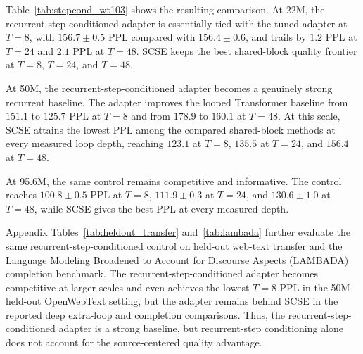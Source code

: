 \documentclass[letterpaper]{article} %
\newcommand{\SCSE}{\textsc{SCSE}}
\theoremstyle{remark}
\begin{document}
Table~\ref{tab:stepcond_wt103} shows the resulting comparison.  At 22M, the recurrent-step-conditioned adapter is essentially tied with the tuned adapter at $T=8$, with $156.7\pm0.5$ PPL compared with $156.4\pm0.6$, and trails by $1.2$ PPL at $T=24$ and $2.1$ PPL at $T=48$.  \SCSE{} keeps the best shared-block quality frontier at $T=8$, $T=24$, and $T=48$.

At 50M, the recurrent-step-conditioned adapter becomes a genuinely strong recurrent baseline.  The adapter improves the looped Transformer baseline from $151.1$ to $125.7$ PPL at $T=8$ and from $178.9$ to $160.1$ at $T=48$.  At this scale, \SCSE{} attains the lowest PPL among the compared shared-block methods at every measured loop depth, reaching $123.1$ at $T=8$, $135.5$ at $T=24$, and $156.4$ at $T=48$.

At 95.6M, the same control remains competitive and informative.  The control reaches $100.8\pm0.5$ PPL at $T=8$, $111.9\pm0.3$ at $T=24$, and $130.6\pm1.0$ at $T=48$, while \SCSE{} gives the best PPL at every measured depth.

Appendix Tables~\ref{tab:heldout_transfer} and~\ref{tab:lambada} further evaluate the same recurrent-step-conditioned control on held-out web-text transfer and the Language Modeling Broadened to Account for Discourse Aspects (LAMBADA) completion benchmark.  The recurrent-step-conditioned adapter becomes competitive at larger scales and even achieves the lowest $T=8$ PPL in the 50M held-out OpenWebText setting, but the adapter remains behind \SCSE{} in the reported deep extra-loop and completion comparisons.  Thus, the recurrent-step-conditioned adapter is a strong baseline, but recurrent-step conditioning alone does not account for the source-centered quality advantage.
\end{document}
